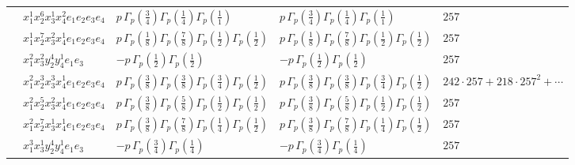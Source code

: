 \documentclass[11pt]{article}
\begin{document}
\begin{table}[ht]
{\begin{tabular}{@{}lllll@{}}
 & $x_{1}^{1} x_{2}^{6} x_{3}^{1} x_{4}^{2}  e_{1} e_{2} e_{3} e_{4}$ & $p \, \Gamma_p \left( \frac{3}{4} \right) \Gamma_p \left( \frac{1}{4} \right) \Gamma_p \left( \frac{1}{1} \right)$ & $p \, \Gamma_p \left( \frac{3}{4} \right) \Gamma_p \left( \frac{1}{4} \right) \Gamma_p \left( \frac{1}{1} \right)$ & $257$ \\
 & $x_{1}^{1} x_{2}^{7} x_{3}^{2} x_{4}^{1}  e_{1} e_{2} e_{3} e_{4}$ & $p \, \Gamma_p \left( \frac{1}{8} \right) \Gamma_p \left( \frac{7}{8} \right) \Gamma_p \left( \frac{1}{2} \right) \Gamma_p \left( \frac{1}{2} \right)$ & $p \, \Gamma_p \left( \frac{1}{8} \right) \Gamma_p \left( \frac{7}{8} \right) \Gamma_p \left( \frac{1}{2} \right) \Gamma_p \left( \frac{1}{2} \right)$ & $257$ \\
 & $x_{1}^{2} x_{3}^{2} y_{2}^{4} y_{4}^{1} e_{1} e_{3}$ & $- p \, \Gamma_p \left( \frac{1}{2} \right) \Gamma_p \left( \frac{1}{2} \right)$ & $- p \, \Gamma_p \left( \frac{1}{2} \right) \Gamma_p \left( \frac{1}{2} \right)$ & $257$ \\
 & $x_{1}^{2} x_{2}^{3} x_{3}^{3} x_{4}^{1}  e_{1} e_{2} e_{3} e_{4}$ & $p \, \Gamma_p \left( \frac{3}{8} \right) \Gamma_p \left( \frac{3}{8} \right) \Gamma_p \left( \frac{3}{4} \right) \Gamma_p \left( \frac{1}{2} \right)$ & $p \, \Gamma_p \left( \frac{3}{8} \right) \Gamma_p \left( \frac{3}{8} \right) \Gamma_p \left( \frac{3}{4} \right) \Gamma_p \left( \frac{1}{2} \right)$ & $242{\cdot}257{+}218{\cdot}257^{2}{+}\cdots$ \\
 & $x_{1}^{2} x_{2}^{5} x_{3}^{2} x_{4}^{1}  e_{1} e_{2} e_{3} e_{4}$ & $p \, \Gamma_p \left( \frac{3}{8} \right) \Gamma_p \left( \frac{5}{8} \right) \Gamma_p \left( \frac{1}{2} \right) \Gamma_p \left( \frac{1}{2} \right)$ & $p \, \Gamma_p \left( \frac{3}{8} \right) \Gamma_p \left( \frac{5}{8} \right) \Gamma_p \left( \frac{1}{2} \right) \Gamma_p \left( \frac{1}{2} \right)$ & $257$ \\
 & $x_{1}^{2} x_{2}^{7} x_{3}^{1} x_{4}^{1}  e_{1} e_{2} e_{3} e_{4}$ & $p \, \Gamma_p \left( \frac{3}{8} \right) \Gamma_p \left( \frac{7}{8} \right) \Gamma_p \left( \frac{1}{4} \right) \Gamma_p \left( \frac{1}{2} \right)$ & $p \, \Gamma_p \left( \frac{3}{8} \right) \Gamma_p \left( \frac{7}{8} \right) \Gamma_p \left( \frac{1}{4} \right) \Gamma_p \left( \frac{1}{2} \right)$ & $257$ \\
 & $x_{1}^{3} x_{3}^{1} y_{2}^{4} y_{4}^{1} e_{1} e_{3}$ & $- p \, \Gamma_p \left( \frac{3}{4} \right) \Gamma_p \left( \frac{1}{4} \right)$ & $- p \, \Gamma_p \left( \frac{3}{4} \right) \Gamma_p \left( \frac{1}{4} \right)$ & $257$ \\

\end{tabular}}
\end{table}
\end{document}

